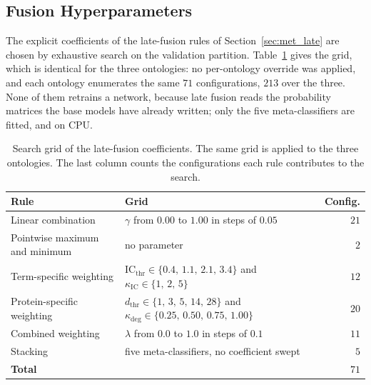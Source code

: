 \documentclass[Ingles]{ic-tese-v3}
\begin{document}
\begin{appendices}{}
\section{Fusion Hyperparameters}
\label{ape:fusao}

The explicit coefficients of the late-fusion rules of Section~\ref{sec:met_late} are chosen by
exhaustive search on the validation partition. Table~\ref{tab:ape_fusao_grade} gives the grid, which
is identical for the three ontologies: no per-ontology override was applied, and each ontology
enumerates the same $71$ configurations, $213$ over the three. None of them retrains a network,
because late fusion reads the probability matrices the base models have already written; only the
five meta-classifiers are fitted, and on CPU.

\begin{table}[!htb]
  \centering
  \small
  \caption{Search grid of the late-fusion coefficients. The same grid is applied to the three
  ontologies. The last column counts the configurations each rule contributes to the search.}
  \label{tab:ape_fusao_grade}
  \begin{tabular}{lp{6.4cm}r}
    \hline
    \textbf{Rule} & \textbf{Grid} & \textbf{Config.} \\
    \hline
    Linear combination            & $\gamma$ from $0.00$ to $1.00$ in steps of $0.05$ & $21$ \\
    Pointwise maximum and minimum & no parameter & $2$ \\
    Term-specific weighting       & $\mathrm{IC}_{\text{thr}} \in \{0.4,\,1.1,\,2.1,\,3.4\}$ and $\kappa_{\mathrm{IC}} \in \{1,\,2,\,5\}$ & $12$ \\
    Protein-specific weighting    & $d_{\text{thr}} \in \{1,\,3,\,5,\,14,\,28\}$ and $\kappa_{\deg} \in \{0.25,\,0.50,\,0.75,\,1.00\}$ & $20$ \\
    Combined weighting            & $\lambda$ from $0.0$ to $1.0$ in steps of $0.1$ & $11$ \\
    Stacking                      & five meta-classifiers, no coefficient swept & $5$ \\
    \hline
    \textbf{Total}                &                                              & \textbf{$71$} \\
    \hline
  \end{tabular}
\end{table}


\end{appendices}
\end{document}
